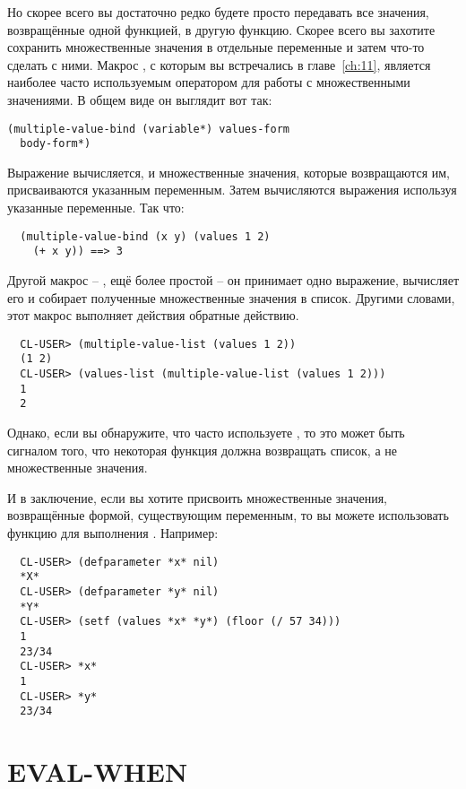 Но скорее всего вы достаточно редко будете просто передавать все значения, возвращённые
одной функцией, в другую функцию.  Скорее всего вы захотите сохранить множественные
значения в отдельные переменные и затем что-то сделать с ними.  Макрос
, с которым вы встречались в главе~\ref{ch:11}, является
наиболее часто используемым оператором для работы с множественными значениями.  В общем
виде он выглядит вот так:

\begin{lstlisting}
(multiple-value-bind (variable*) values-form
  body-form*)
\end{lstlisting}

Выражение  вычисляется, и множественные значения, которые возвращаются
им, присваиваются указанным переменным.  Затем вычисляются выражения 
используя указанные переменные.  Так что:

\begin{verbatim}
  (multiple-value-bind (x y) (values 1 2)
    (+ x y)) ==> 3
\end{verbatim}

Другой макрос -- , ещё более простой -- он принимает одно
выражение, вычисляет его и собирает полученные множественные значения в список.  Другими
словами, этот макрос выполняет действия обратные действию.

\begin{verbatim}
  CL-USER> (multiple-value-list (values 1 2))
  (1 2)
  CL-USER> (values-list (multiple-value-list (values 1 2)))
  1
  2
\end{verbatim}

Однако, если вы обнаружите, что часто используете , то это может
быть сигналом того, что некоторая функция должна возвращать список, а не множественные
значения.

И в заключение, если вы хотите присвоить множественные значения, возвращённые формой,
существующим переменным, то вы можете использовать функцию  для выполнения
.  Например:

\begin{verbatim}
  CL-USER> (defparameter *x* nil)
  *X*
  CL-USER> (defparameter *y* nil)
  *Y*
  CL-USER> (setf (values *x* *y*) (floor (/ 57 34)))
  1
  23/34
  CL-USER> *x*
  1
  CL-USER> *y*
  23/34
\end{verbatim}

\section{EVAL-WHEN}

